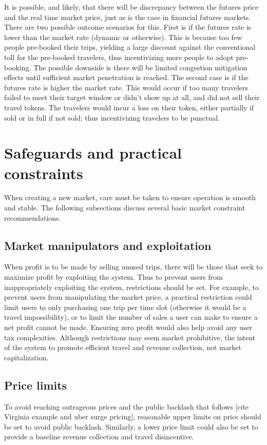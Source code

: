 \documentclass{article}
\begin{document}
It is possible, and likely, that there will be discrepancy between the futures price and the real time market price, just as is the case in financial futures markets. There are two possible outcome scenarios for this. First is if the futures rate is lower than the market rate (dynamic or otherwise). This is because too few people pre-booked their trips, yielding a large discount against the conventional toll for the pre-booked travelers, thus incentivizing more people to adopt pre-booking. The possible downside is there will be limited congestion mitigation effects until sufficient market penetration is reached. The second case is if the futures rate is higher the market rate. This would occur if too many travelers failed to meet their target window or didn't show up at all, and did not sell their travel tokens. The travelers would incur a loss on their token, either partially if sold or in full if not sold; thus incentivizing travelers to be punctual. 

\section{Safeguards and practical constraints}
When creating a new market, care must be taken to ensure operation is smooth and stable. The following subsections discuss several basic market constraint recommendations.

\subsection{Market manipulators and exploitation}
When profit is to be made by selling unused trips, there will be those that seek to maximize profit by exploiting the system.  Thus to prevent users from inappropriately exploiting the system, restrictions should be set. For example, to prevent users from manipulating the market price, a practical restriction could limit users to only purchasing one trip per time slot (otherwise it would be a travel impossibility), or to limit the number of sales a user can make to ensure a net profit cannot be made. Ensuring zero profit would also help avoid any user tax complexities. Although restrictions may seem market prohibitive, the intent of the system to promote efficient travel and revenue collection, not market capitalization. 

\subsection{Price limits}
To avoid reaching outrageous prices and the public backlash that follows [cite Virginia example and uber surge pricing], reasonable upper limits on price should be set to avoid public backlash. Similarly, a lower price limit could also be set to provide a baseline revenue collection and travel disincentive.
\end{document}
